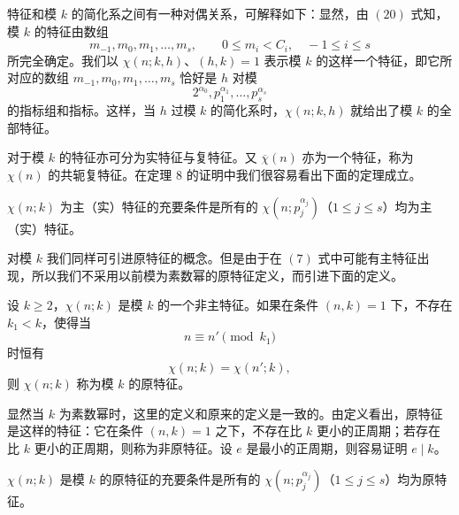 特征和模 $k$ 的简化系之间有一种对偶关系，可解释如下：显然，由 \((20)\) 式知，模 $k$ 的特征由数组
\[
	m_{-1},m_0,m_1,\ldots,m_s,\qquad 0\leq m_i<C_i,\quad -1\leq i\leq s
\]
所完全确定。我们以 $\chi(n;k,h)$、$(h,k)=1$ 表示模 $k$ 的这样一个特征，即它所对应的数组 $m_{-1},m_0,m_1,\ldots,m_s$ 恰好是 $h$ 对模
\[
	2^{\alpha_0},p_1^{\alpha_1},\ldots,p_s^{\alpha_s}
\]
的指标组和指标。这样，当 $h$ 过模 $k$ 的简化系时，$\chi(n;k,h)$ 就给出了模 $k$ 的全部特征。

对于模 $k$ 的特征亦可分为实特征与复特征。又 $\overline{\chi}(n)$ 亦为一个特征，称为 $\chi(n)$ 的共轭复特征。在定理 8 的证明中我们很容易看出下面的定理成立。

\begin{theorem}[原文 定理 10]
	$\chi(n;k)$ 为主（实）特征的充要条件是所有的 $\chi(n;p_j^{\alpha_j})$（$1\leq j\leq s$）均为主（实）特征。
\end{theorem}

对模 $k$ 我们同样可引进原特征的概念。但是由于在 \((7)\) 式中可能有主特征出现，所以我们不采用以前模为素数幂的原特征定义，而引进下面的定义。

\begin{definition}[原文 定义 4]
	设 $k\geq2$，$\chi(n;k)$ 是模 $k$ 的一个非主特征。如果在条件 $(n,k)=1$ 下，不存在 $k_1<k$，使得当
	\[
		n\equiv n'\pmod {k_1}
	\]
	时恒有
	\[
		\chi(n;k)=\chi(n';k),
	\]
	则 $\chi(n;k)$ 称为模 $k$ 的原特征。
\end{definition}

显然当 $k$ 为素数幂时，这里的定义和原来的定义是一致的。由定义看出，原特征是这样的特征：它在条件 $(n,k)=1$ 之下，不存在比 $k$ 更小的正周期；若存在比 $k$ 更小的正周期，则称为非原特征。设 $e$ 是最小的正周期，则容易证明 $e\mid k$。

\begin{theorem}[原文 定理 11]
	$\chi(n;k)$ 是模 $k$ 的原特征的充要条件是所有的 $\chi(n;p_j^{\alpha_j})$（$1\leq j\leq s$）均为原特征。
\end{theorem}


